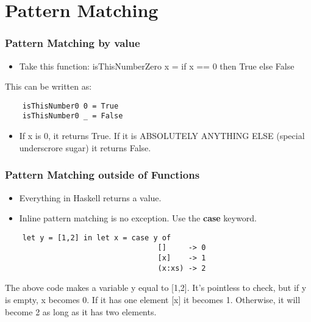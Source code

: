 \documentclass{beamer}
\begin{document}
\section{Pattern Matching}


\begin{frame}[fragile]
  \frametitle{Pattern Matching by value}
  \begin{itemize}
  \item Take this function: isThisNumberZero x = if x == 0 then True else False\pause
  \end{itemize}
  This can be written as:
  \begin{lstlisting}
    isThisNumber0 0 = True
    isThisNumber0 _ = False
  \end{lstlisting} 
  \begin{itemize}
  \item If x is 0, it returns True. If it is ABSOLUTELY ANYTHING ELSE (special underscrore sugar) it returns False.
  \end{itemize}
\end{frame}

\begin{frame}[fragile]
  \frametitle{Pattern Matching outside of Functions}
  \begin{itemize}
  \item Everything in Haskell returns a value.\pause
  \item Inline pattern matching is no exception. Use the {\bf case} keyword.\pause
  \end{itemize}

  \begin{lstlisting}
    let y = [1,2] in let x = case y of
                                   []     -> 0
                                   [x]    -> 1
                                   (x:xs) -> 2
  \end{lstlisting}
  
  The above code makes a variable y equal to [1,2]. It's pointless to check, but if y is empty, x becomes 0. If it has one element [x] it becomes 1. Otherwise, it will become 2 as long as it has two elements.
\end{frame}
\end{document}
